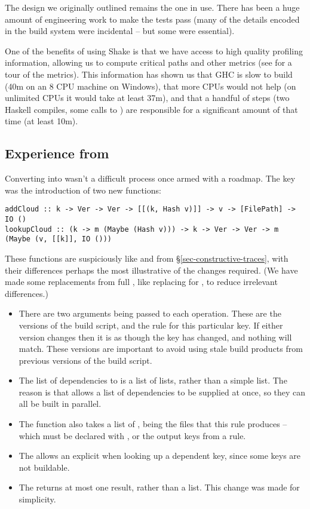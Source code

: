 The design we originally outlined remains the one in use. There has been a huge amount of engineering work to make the tests pass (many of the details encoded in the \Make build system were incidental -- but some were essential).

One of the benefits of using Shake is that we have access to high quality profiling information, allowing us to compute critical paths and other metrics (see \cite{mitchell2019ghcrebuildtimes} for a tour of the metrics). This information has shown us that GHC is slow to build (40m on an 8 CPU machine on Windows), that more CPUs would not help (on unlimited CPUs it would take at least 37m), and that a handful of steps (two Haskell compiles, some calls to ) are responsible for a significant amount of that time (at least 10m).

\subsection{Experience from \Cloud \Shake}\label{sec-cloud-shake}

Converting \Shake into \Cloud \Shake wasn't a difficult process once armed with a roadmap. The key was the introduction of two new functions:

\begin{verbatim}
addCloud :: k -> Ver -> Ver -> [[(k, Hash v)]] -> v -> [FilePath] -> IO ()
lookupCloud :: (k -> m (Maybe (Hash v))) -> k -> Ver -> Ver -> m (Maybe (v, [[k]], IO ()))
\end{verbatim}

These functions are suspiciously like  and  from \S\ref{sec-constructive-traces}, with their differences perhaps the most illustrative of the changes required. (We have made some replacements from full \Shake, like replacing  for , to reduce irrelevant differences.)

\begin{itemize}
\item There are two  arguments being passed to each operation. These are the versions of the build script, and the rule for this particular key. If either version changes then it is as though the key has changed, and nothing will match. These versions are important to avoid using stale build products from previous versions of the build script.
\item The list of dependencies to  is a list of lists, rather than a simple list. The reason is that \Shake allows a list of dependencies to be supplied at once, so they can all be built in parallel.
\item The  function also takes a list of , being the files that this rule produces -- which must be declared with , or the output keys from a rule.
\item The  allows an explicit  when looking up a dependent key, since some keys are not buildable.
\item The  returns at most one result, rather than a list. This change was made for simplicity.
\end{itemize}

